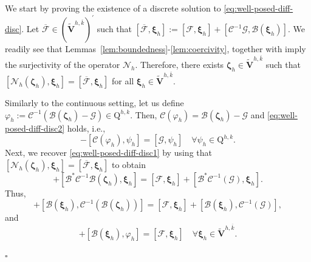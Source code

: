 \documentclass[fleqn,a4paper]{cas-sc}
\newcommand{\bxi}{\boldsymbol{\xi}}
\newcommand{\bzeta}{\boldsymbol{\zeta}}
\newcommand{\0}{\boldsymbol{0}}
\newcommand\cC{\mathcal{C}}
\newcommand\cG{\mathcal{G}}
\newcommand\cF{\mathcal{F}}
\newcommand\bV{\mathbf{V}}
\newcommand\rQ{\mathrm{Q}}
\newcommand\bbPi{\mathbb{\Pi}}
\newcommand\bsigma{\boldsymbol{\sigma}}
\numberwithin{equation}{section}
\numberwithin{figure}{section}
\newenvironment{proof}{\noindent{\it Proof.}}{\hfill$\square$}
\begin{document}
\begin{proof}
    {We start by proving the existence of a discrete solution to \eqref{eq:well-posed-diff-disc}. Let $\overline{\cF} \in (\widetilde{\bV}^{h,\overline{k}})^\prime$ such that $[\overline{\cF}, \bxi_h] := [\cF, \bxi_h] + [\cC^{-1}\cG, \mathcal{B}(\bxi_h)]$. We readily see that Lemmas~\ref{lem:boundedness}-\ref{lem:coercivity}, together with \cite[Corollary 2.2]{showalter1997} imply the surjectivity of the operator $\mathcal{N}_h$. Therefore, there exists $\bzeta_h \in \widetilde{\bV}^{h,\overline{k}}$ such that $[\mathcal{N}_h(\bzeta_h), \bxi_h] = [\overline{\cF}, \bxi_h]$ for all $\bxi_h \in \widetilde{\bV}^{h,\overline{k}}$.}
    
     {Similarly to the continuous setting, let us define $\varphi_h := \cC^{-1} (\mathcal{B}(\bzeta_h) - \cG) \in \rQ^{h,k}$. Then, $\cC(\varphi_h) = \mathcal{B}(\bzeta_h) - \cG$ and \eqref{eq:well-posed-diff-disc2} holds, i.e.,
    \begin{equation*}
        [\mathcal{B}(\bzeta_h), \psi_h] - [\cC(\varphi_h), \psi_h] = [\cG, \psi_h] \quad \forall \psi_h \in \rQ^{h,k}.
    \end{equation*}
    Next, we recover \eqref{eq:well-posed-diff-disc1} by using that $[\mathcal{N}_h(\bzeta_h), \bxi_h] = [\overline{\cF}, \bxi_h]$ to obtain
    \begin{equation*}
        [\mathcal{A}_{h,\widehat{\bsigma}_h^\bbPi}(\bzeta_h), \bxi_h] + [\mathcal{B}^* \cC^{-1} \mathcal{B}(\bzeta_h), \bxi_h] = [\cF, \bxi_h] + [\mathcal{B}^* \cC^{-1}(\cG), \bxi_h].
    \end{equation*}
    Thus,
    \begin{equation*}
        [\mathcal{A}_{h,\widehat{\bsigma}_h^\bbPi}(\bzeta_h), \bxi_h] + [\mathcal{B}(\bxi_h), \cC^{-1}(\mathcal{B}(\bzeta_h))] = [\cF, \bxi_h] + [\mathcal{B}(\bxi_h), \cC^{-1}(\cG)],
    \end{equation*}
    and
    \begin{equation*}
        [\mathcal{A}_{h,\widehat{\bsigma}_h^\bbPi}(\bzeta_h), \bxi_h] + [\mathcal{B}(\bxi_h), \varphi_h] = [\cF, \bxi_h] \quad \forall \bxi_h \in \widetilde{\bV}^{h,\overline{k}}.
    \end{equation*}
    }


\end{proof}
\end{document}
